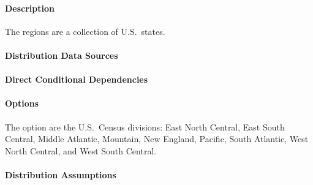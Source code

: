 \paragraph{Description}

The regions are a collection of U.S.~states.

\paragraph{Distribution Data Sources}


\paragraph{Direct Conditional Dependencies}


\paragraph{Options}
The option are the U.S.~Census divisions: East North Central, East South Central, Middle Atlantic, Mountain, New England, Pacific, South Atlantic, West North Central, and West South Central.

\paragraph{Distribution Assumptions}

